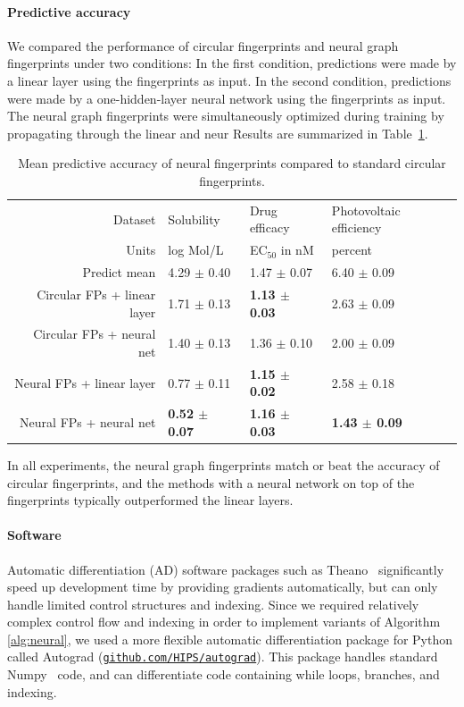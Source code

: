 \documentclass{article}
\newcommand{\citep}{\cite}
\newcommand{\citet}{\cite}
\begin{document}
\paragraph{Predictive accuracy}
We compared the performance of circular fingerprints and neural graph fingerprints under two conditions:
In the first condition, predictions were made by a linear layer using the fingerprints as input.
In the second condition, predictions were made by a one-hidden-layer neural network using the fingerprints as input.
The neural graph fingerprints were simultaneously optimized during training by propagating through the linear and neur
Results are summarized in Table~\ref{table:main results}.
%
\begin{table}
\begin{center}
\begin{tabular}{r|lll}
Dataset                      &   Solubility \citet{delaney_data_2004} & Drug efficacy \citet{gamo2010thousands} & Photovoltaic efficiency \citet{hachmann2011harvard} \\
Units                        &   log Mol/L                            & EC$_{50}$ in nM                        & percent \\
\midrule
Predict mean                 & 4.29 $\pm$ 0.40        & 1.47 $\pm$ 0.07         & 6.40 $\pm$ 0.09 \\
Circular FPs + linear layer  & 1.71 $\pm$ 0.13        & \bf{1.13} $\pm$ 0.03    & 2.63 $\pm$ 0.09 \\
Circular FPs + neural net    & 1.40 $\pm$ 0.13        & 1.36 $\pm$ 0.10         & 2.00 $\pm$ 0.09 \\ 
Neural FPs + linear layer    & 0.77 $\pm$ 0.11        & \bf{1.15} $\pm$ 0.02    & 2.58 $\pm$ 0.18 \\  
Neural FPs + neural net      & \bf{0.52} $\pm$ 0.07   & \bf{1.16} $\pm$ 0.03    & \bf{1.43} $\pm$ 0.09
\end{tabular}
\label{table:main results}
\caption{Mean predictive accuracy of neural fingerprints compared to standard circular fingerprints.}
\end{center}
\end{table}
%

In all experiments, the neural graph fingerprints match or beat the accuracy of circular fingerprints, and the methods with a neural network on top of the fingerprints typically outperformed the linear layers.

\paragraph{Software}
Automatic differentiation (AD) software packages such as Theano~\citep{Bastien-Theano-2012} significantly speed up development time by providing gradients automatically, but can only handle limited control structures and indexing.
Since we required relatively complex control flow and indexing in order to implement variants of Algorithm \ref{alg:neural}, we used a more flexible automatic differentiation package for Python called Autograd (\href{http://github.com/HIPS/autograd}{\texttt{github.com/HIPS/autograd}}).
This package handles standard Numpy~\citep{oliphant2007python} code, and can differentiate code containing while loops, branches, and indexing.
\end{document}
